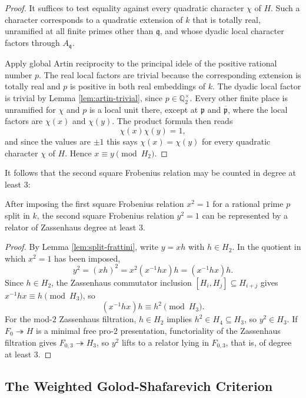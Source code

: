 \begin{proof}
It suffices to test equality against every quadratic character $\chi$ of $H$.  Such a character corresponds to a quadratic extension of $k$ that is totally real, unramified at all finite primes other than $\mathfrak{q}$, and whose dyadic local character factors through $A_{\mathfrak{q}}$.

Apply global Artin reciprocity to the principal idele of the positive rational number $p$.  The real local factors are trivial because the corresponding extension is totally real and $p$ is positive in both real embeddings of $k$.  The dyadic local factor is trivial by Lemma \ref{lem:artin-trivial}, since $p\in\mathbb{Q}_2^\times$.  Every other finite place is unramified for $\chi$ and $p$ is a local unit there, except at $\mathfrak{p}$ and $\overline{\mathfrak{p}}$, where the local factors are $\chi(x)$ and $\chi(y)$.  The product formula then reads
\[
   \chi(x)\chi(y)=1,
\]
and since the values are $\pm1$ this says $\chi(x)=\chi(y)$ for every quadratic character $\chi$ of $H$.  Hence $x\equiv y\pmod{H_2}$.
\end{proof}

It follows that the second square Frobenius relation may be counted in degree at least $3$:
\begin{proposition}\label{lem:degree-three}
After imposing the first square Frobenius relation $x^2=1$ for a rational prime $p$ split in $k$, the second square Frobenius relation $y^2=1$ can be represented by a relator of Zassenhaus degree at least $3$.
\end{proposition}

\begin{proof}
By Lemma \ref{lem:split-frattini}, write $y=xh$ with $h\in H_2$.  In the quotient in which $x^2=1$ has been imposed,
\[
   y^2=(xh)^2=x^2(x^{-1}hx)h=(x^{-1}hx)h.
\]
Since $h\in H_2$, the Zassenhaus commutator inclusion $[H_i,H_j]\subseteq H_{i+j}$ gives $x^{-1}hx\equiv h\pmod {H_3}$, so
\[
   (x^{-1}hx)h\equiv h^2\pmod {H_3}.
\]
For the mod-$2$ Zassenhaus filtration, $h\in H_2$ implies $h^2\in H_4\subseteq H_3$, so $y^2\in H_3$.  If $F_0\twoheadrightarrow H$ is a minimal free pro-$2$ presentation, functoriality of the Zassenhaus filtration gives $F_{0,3}\twoheadrightarrow H_3$, so $y^2$ lifts to a relator lying in $F_{0,3}$, that is, of degree at least $3$.
\end{proof}

\subsection{The Weighted Golod-Shafarevich Criterion}

